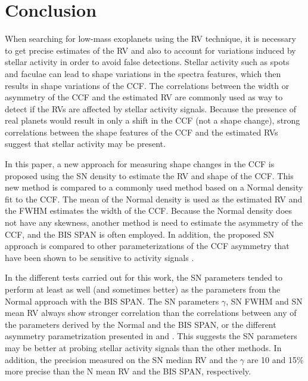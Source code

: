 \documentclass{aa}
\begin{document}

\section{Conclusion} \label{sec:conclu}


When searching for low-mass exoplanets using the RV technique, it is necessary to get precise estimates of the RV and also to account for variations induced by stellar activity in order to avoid false detections.  Stellar activity such as spots and faculae can lead to shape variations in the spectra features, which then results in shape variations of the CCF.
The correlations between the width or asymmetry of the CCF and the estimated RV are commonly used as way to detect if the RVs are affected by stellar activity signals.   Because the presence of real planets would result in only a shift in the CCF (not a shape change), strong correlations between the shape features of the CCF and the estimated RVs suggest that stellar activity may be present.

In this paper, a new approach for measuring shape changes in the CCF is proposed using the SN density to estimate the RV and shape of the CCF. 
This new method is compared to a commonly used method based on a Normal density fit to the CCF.  The mean of the Normal density is used as the estimated RV and the FWHM estimates the width of the CCF.  Because the Normal density does not have any skewness, another method is need to estimate the asymmetry of the CCF, and the BIS SPAN is often employed.
In addition, the proposed SN approach is compared to other parameterizations of the CCF asymmetry that have been shown to be sensitive to activity signals \citep[][]{Boisse-2011,Figueira-2013}.

In the different tests carried out for this work, the SN parameters tended to perform at least as well (and sometimes better) as the parameters from the Normal approach with the BIS SPAN.
The SN parameters $\gamma$, SN FWHM and SN mean RV always show stronger correlation than the correlations between any of the parameters derived by the Normal and the BIS SPAN, or the different asymmetry parametrization presented in \citet{Boisse-2011} and \citet{Figueira-2013}. 
This suggests the SN parameters may be better at probing stellar activity signals than the other methods. 
In addition, the precision measured on the SN median RV and the $\gamma$ are 10 and 15\% more precise than the N mean RV and the BIS SPAN, respectively.
\end{document}
